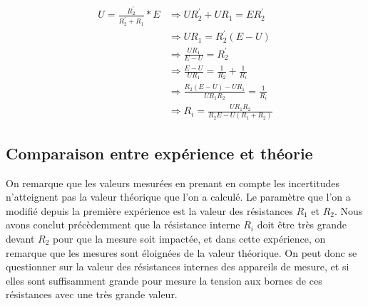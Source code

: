 \documentclass[10pt]{article}
\begin{document}
\begin{table}[h!]
    \begin{equation}
        \begin{split}
            U = \frac{R_2^{'}}{R_2^{'} + R_1} * E & \Rightarrow U R_2^{'} + U R_1 = E R_2^{'} \\
            & \Rightarrow U R_1 = R_2^{'} (E - U) \\
            & \Rightarrow \frac{U R_1}{E - U} = R_2^{'} \\
            & \Rightarrow \frac{E - U}{UR_1} = \frac{1}{R_2} + \frac{1}{R_i} \\
            & \Rightarrow \frac{R_2 (E - U) - U R_1}{UR_1R_2} = \frac{1}{R_i} \\
            & \Rightarrow R_i = \frac{U R_1 R_2}{R_2 E - U (R_1 + R_2)}
        \end{split}
        \label{eqn:ri}
    \end{equation}

    \subsection{Comparaison entre expérience et théorie}
    On remarque que les valeurs mesurées en prenant en compte les incertitudes n'atteignent pas la valeur théorique que l'on a calculé.
    Le paramètre que l'on a modifié depuis la première expérience est la valeur des résistances $R_1$ et $R_2$. 
    Nous avons conclut précèdemment que la résistance interne $R_i$ doit être très grande devant $R_2$ pour que la mesure soit impactée,
    et dans cette expérience, on remarque que les mesures sont éloignées de la valeur théorique. 
    On peut donc se questionner sur la valeur des résistances internes des appareils de mesure, et si elles sont suffisamment grande
    pour mesure la tension aux bornes de ces résistances avec une très grande valeur.

\end{table}
\end{document}

